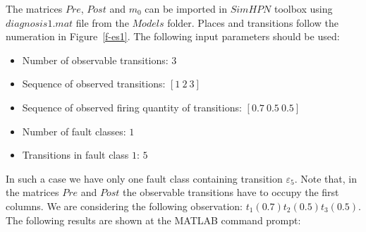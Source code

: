 The matrices $Pre$, $Post$ and $m_0$ can be imported in $SimHPN$ toolbox using
$diagnosis1.mat$ file from the $Models$ folder. Places and transitions follow the
numeration in Figure~\ref{f-es1}. The following input parameters should be used:

\begin{itemize}
\item Number of observable transitions: $3$
\item Sequence of observed transitions: $[ 1 \ 2 \ 3 ]$
\item Sequence of observed firing quantity of transitions: $[0.7 \ 0.5 \ 0.5]$
\item Number of fault classes: $1$
\item Transitions in fault class $1$: $5$
\end{itemize}

In such a case we have only one fault class containing transition
$\varepsilon_5$. Note that, in the matrices $Pre$ and $Post$ the observable transitions have to
occupy the first columns. We are considering the following
observation: $t_1(0.7) t_2(0.5) t_3(0.5)$. The following results are shown at the MATLAB command prompt:

